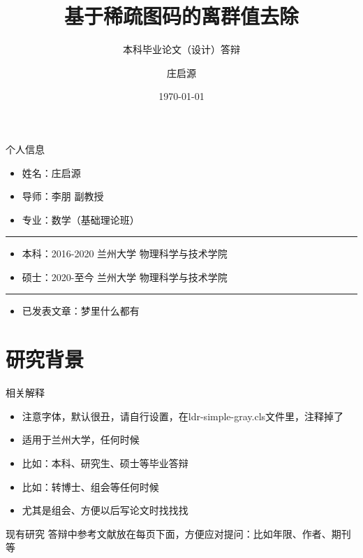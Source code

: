 \documentclass{ldr-simple-gray}
\title{基于稀疏图码的离群值去除}
\subtitle{本科毕业论文（设计）答辩}
\author{庄启源}
\institute[]
{
导师：李朋 副教授\\
兰州大学\quad 数学与统计学院
}
\date{\today}
\begin{document}
\frame{\titlepage}


\begin{frame}{个人信息}

    \begin{itemize}
        \item 姓名：庄启源
        \item 导师：李朋 副教授
        \item 专业：数学（基础理论班）
    \end{itemize}

    \qquad \noindent\rule[0.25\baselineskip]{0.9\textwidth}{1pt}

    \begin{itemize}
        \item 本科：2016-2020 \quad 兰州大学 \quad 物理科学与技术学院
        \item 硕士：2020-至今 \quad 兰州大学 \quad 物理科学与技术学院
    \end{itemize}

    \qquad \noindent\rule[0.25\baselineskip]{0.9\textwidth}{1pt}

    \begin{itemize}
        \item 已发表文章：梦里什么都有 ~
    \end{itemize}
\end{frame}


\section{研究背景}

\begin{frame}{相关解释}
    \begin{itemize}
        \item 注意字体，默认很丑，请自行设置，在ldr-simple-gray.cls文件里，注释掉了
        \item 适用于兰州大学，任何时候
        \item 比如：本科、研究生、硕士等毕业答辩
        \item 比如：转博士、组会等任何时候
        \item 尤其是组会、方便以后写论文时找找找
    \end{itemize}
    
\end{frame}


\begin{frame}{现有研究}
    答辩中参考文献放在每页下面，方便应对提问：比如年限、作者、期刊等
    \begin{figure}
         \\
    \end{figure}
\end{frame}
\end{document}
